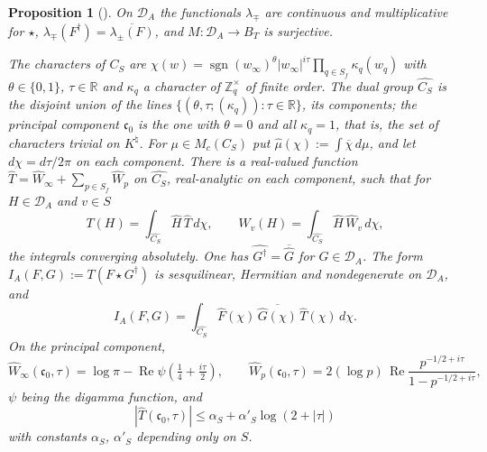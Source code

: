 \documentclass[11pt]{amsart}
\newtheorem{proposition}[theorem]{Proposition}
\theoremstyle{definition}
\newcommand{\R}{\mathbb R}
\newcommand{\Z}{\mathbb Z}
\newcommand{\Rel}{\operatorname{Re}}
\newcommand{\Knat}{K^{\natural}}
\newcommand{\DA}{\mathcal D_A}
\begin{document}
\begin{proposition}[{\cite[(40), (41), Theorem~5.11, Theorems~5.12 and~6.5,
Proposition~6.3]{Companion}}]\label{prop:tate}
On $\DA$ the functionals $\lambda_\mp$ are continuous and multiplicative for
$\star$, $\lambda_\mp(F^\dagger)=\overline{\lambda_\pm(F)}$, and
$M:\DA\to B_T$ is surjective.

The characters of $C_S$ are
$\chi(w)=\operatorname{sgn}(w_\infty)^{\theta}|w_\infty|^{i\tau}
\prod_{q\in S_f}\kappa_q(w_q)$ with $\theta\in\{0,1\}$, $\tau\in\R$ and
$\kappa_q$ a character of $\Z_q^\times$ of finite order. The dual group
$\widehat{C_S}$ is the disjoint union of the lines
$\{(\theta,\tau;(\kappa_q)):\tau\in\R\}$, its components; the principal
component $\mathfrak c_0$ is the one with $\theta=0$ and all $\kappa_q=1$,
that is, the set of characters trivial on $\Knat$. For $\mu\in M_c(C_S)$ put
$\widehat\mu(\chi):=\int\overline\chi\,d\mu$, and let $d\chi=d\tau/2\pi$ on
each component. There is a real-valued function $\widehat T=\widehat W_\infty
+\sum_{p\in S_f}\widehat W_p$ on $\widehat{C_S}$, real-analytic on each
component, such that for $H\in\DA$ and $v\in S$
\begin{equation}\label{eq:plancherelv}
  T(H)=\int_{\widehat{C_S}}\widehat H\,\widehat T\,d\chi,\qquad
  W_v(H)=\int_{\widehat{C_S}}\widehat H\,\widehat W_v\,d\chi,
\end{equation}
the integrals converging absolutely. One has
$\widehat{G^\dagger}=\overline{\widehat G}$ for $G\in\DA$. The form
$I_A(F,G):=T(F\star G^\dagger)$ is sesquilinear, Hermitian and nondegenerate
on $\DA$, and
\begin{equation}\label{eq:planch}
  I_A(F,G)=\int_{\widehat{C_S}}\widehat F(\chi)\,\overline{\widehat G(\chi)}\,
    \widehat T(\chi)\,d\chi .
\end{equation}
On the principal component,
\begin{equation}\label{eq:symbol}
  \widehat W_\infty(\mathfrak c_0,\tau)=\log\pi
    -\Rel\psi\!\left(\tfrac14+\tfrac{i\tau}2\right),
  \qquad
  \widehat W_p(\mathfrak c_0,\tau)=2(\log p)\,\Rel
    \frac{p^{-1/2+i\tau}}{1-p^{-1/2+i\tau}},
\end{equation}
$\psi$ being the digamma function, and
\begin{equation}\label{eq:logbound}
  |\widehat T(\mathfrak c_0,\tau)|\le\alpha_S+\alpha'_S\log(2+|\tau|)
\end{equation}
with constants $\alpha_S$, $\alpha'_S$ depending only on $S$.
\end{proposition}
\end{document}
